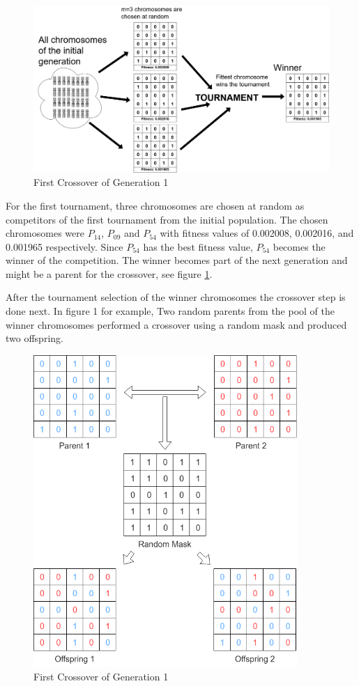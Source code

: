     \begin{figure}[h]
        \centering
        \includegraphics[width=\linewidth]{Figures/tournamentSmall.png}
        \caption{First Crossover of Generation 1}
        \label{tournamentSmall}
    \end{figure}
    
    For the first tournament, three chromosomes are chosen at random as competitors of the first tournament from the initial population. The chosen chromosomes were $P_{14}$, $P_{09}$ and $P_{54}$ with fitness values of 0.002008, 0.002016, and 0.001965 respectively. Since $P_{54}$ has the best fitness value, $P_{54}$ becomes the winner of the competition. The winner becomes part of the next generation and might be a parent for the crossover, see figure \ref{tournamentSmall}.

    After the tournament selection of the winner chromosomes the crossover step is done next. In figure 1 for example, Two random parents from the pool of the winner chromosomes performed a crossover using a random mask and produced two offspring. 
    
    \begin{figure}[h]
        \centering
        \includegraphics[width=100mm]{Figures/crossoverSmall.png}
        \caption{First Crossover of Generation 1}
        \label{fig:my_label}
    \end{figure}
    
